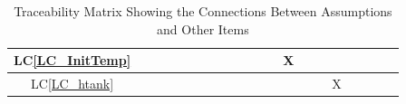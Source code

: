 \documentclass[12pt]{article}
\newcommand{\lcref}[1]{LC\ref{#1}}
\begin{document}
{\begin{landscape}
\begin{table}[h!]
\begin{tabular}{|c|c|c|c|c|c|c|c|c|c|c|c|c|c|c|c|c|c|c|c|}
        \lcref{LC_InitTemp} &                            &                 &                &               &                        &                  &                    &                &                 &                   &                 & X                 &                     &                  &                &                   &               &                    &                   \\ \hline
        \lcref{LC_htank}    &                            &                 &                &               &                        &                  &                    &                &                 &                   &                 &                   &                     &                  & X              &                   &               &                    &                   \\
        \hline
      \end{tabular}
      \caption{Traceability Matrix Showing the Connections Between Assumptions and Other Items}
      \label{Table:A_trace}
    \end{table}
  \end{landscape}
}
\end{document}
